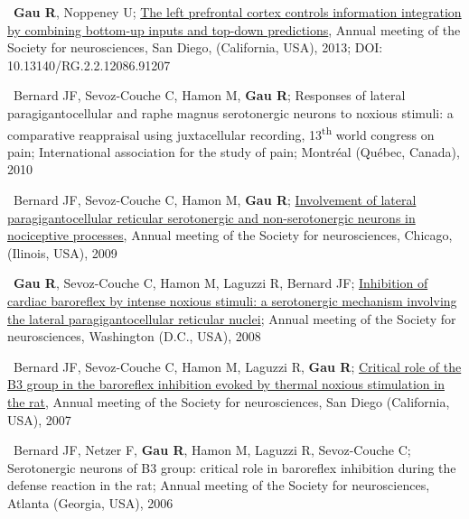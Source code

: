 \documentclass[a4paper,12pt,oneside]{letter}
\begin{document}
{\textbullet~\textbf{Gau R}, Noppeney U; \href{http://www.researchgate.net/profile/Remi_Gau/publication/312040995_Effect_of_sensory_modality_and_attention_on_layer-specific_activations_in_sensory_cortices/links/586bef4108ae329d621216ff.pdf?origin=publication_detail&ev=pub_int_prw_xdl&msrp=rWGQkC7vAu_P6H2YxCI3M31egmAPzpbXdoRN1OdTlFE2ytvRyytc2DItV2mPnvlGPXAOT-Q0hOx0cWKEfhvF_ZK7oOzQtXTOX1cxj1f7wdc.EjFU3lhxIUR_qptyNrCYqZDXVg6nG7zWe8VL0WxLSdSMUGnjz_v4L5Yov-RWctdEwDPFRXLasy1FBdCk7Dlydw.IANTdlTw5MPB88HQJNdTi7lFv6Sygddbknct3mMTSsgH20heYrYcKnbsQLxtcsNd-HHWZUEIEP4-7bkQLNDUhQ}{The left prefrontal cortex controls information integration by combining bottom-up inputs and top-down predictions}, Annual meeting of the Society for neurosciences, San Diego, (California, USA), 2013; DOI: 10.13140/RG.2.2.12086.91207

\textbullet~Bernard JF, Sevoz-Couche C, Hamon M, \textbf{Gau R}; Responses of lateral paragigantocellular and raphe magnus serotonergic neurons to noxious stimuli: a comparative reappraisal using juxtacellular recording, 13\textsuperscript{th} world congress on pain; International association for the study of pain; Montréal (Québec, Canada), 2010

\textbullet~Bernard JF, Sevoz-Couche C, Hamon M, \textbf{Gau R}; \href{https://osf.io/efqub/}{Involvement of lateral paragigantocellular reticular serotonergic and non-serotonergic neurons in nociceptive processes}, Annual meeting of the Society for neurosciences, Chicago, (Ilinois, USA), 2009

\textbullet~\textbf{Gau R}, Sevoz-Couche C, Hamon M, Laguzzi R, Bernard JF; \href{https://osf.io/hxkgv/}{Inhibition of cardiac baroreflex by intense noxious stimuli: a serotonergic mechanism involving the lateral paragigantocellular reticular nuclei}; Annual meeting of the Society for neurosciences, Washington (D.C., USA), 2008

\textbullet~Bernard JF, Sevoz-Couche C, Hamon M, Laguzzi R, \textbf{Gau R}; \href{https://osf.io/4rjst/}{Critical role of the B3 group in the baroreflex inhibition evoked by thermal noxious stimulation in the rat}, Annual meeting of the Society for neurosciences, San Diego (California, USA), 2007

\textbullet~Bernard JF, Netzer F, \textbf{Gau R}, Hamon M, Laguzzi R, Sevoz-Couche C; Serotonergic neurons of B3 group: critical role in baroreflex inhibition during the defense reaction in the rat; Annual meeting of the Society for neurosciences, Atlanta (Georgia, USA), 2006


}
\end{document}
